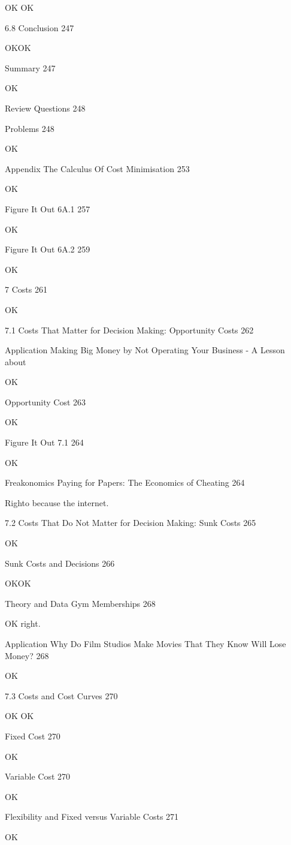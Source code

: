 OK OK

6.8 Conclusion 247

OKOK

Summary 247

OK

Review Questions 248



Problems 248

OK

Appendix The Calculus Of Cost Minimisation 253

OK

Figure It Out 6A.1 257

OK

Figure It Out 6A.2 259

OK

7 Costs 261

OK

7.1 Costs That Matter for Decision Making: Opportunity Costs 262



Application Making Big Money by Not Operating Your Business - A Lesson about

OK

Opportunity Cost 263

OK

Figure It Out 7.1 264

OK

Freakonomics Paying for Papers: The Economics of Cheating 264

Righto because the internet.

7.2 Costs That Do Not Matter for Decision Making: Sunk Costs 265

OK

Sunk Costs and Decisions 266

OKOK

Theory and Data Gym Memberships 268

OK right.

Application Why Do Film Studios Make Movies That They Know Will Lose Money? 268

OK

7.3 Costs and Cost Curves 270

OK OK

Fixed Cost 270

OK

Variable Cost 270

OK

Flexibility and Fixed versus Variable Costs 271

OK

